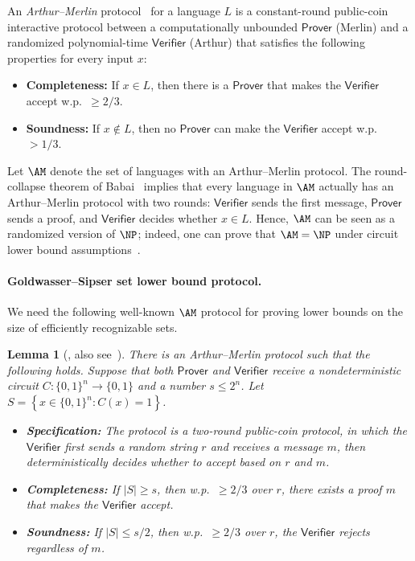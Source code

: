 \documentclass[10pt,a4paper]{article}
\newtheorem{lemma}[theorem]{Lemma}
\theoremstyle{definition}
\theoremstyle{remark}
\newcommand{\Prover}{\mathsf{Prover}}
\newcommand{\Verifier}{\mathsf{Verifier}}
\newcommand{\cbra}[1]{\left\{ #1 \right\}}
\begin{document}
An \emph{Arthur--Merlin} protocol~\cite{Babai85} for a language $L$ is a constant-round public-coin interactive protocol between a computationally unbounded $\Prover$ (Merlin) and a randomized polynomial-time $\Verifier$ (Arthur) that satisfies the following properties for every input $x$:
\begin{itemize}
    \item {\bf Completeness:} If $x\in L$, then there is a $\Prover$ that makes the $\Verifier$ accept w.p.~$\ge 2/3$.
    \item {\bf Soundness:} If $x\not\in L$, then no $\Prover$ can make the $\Verifier$ accept w.p.~$>1/3$.
\end{itemize}

Let $\AM$ denote the set of languages with an Arthur--Merlin protocol. The round-collapse theorem of Babai~\cite{Babai85} implies that every language in $\AM$ actually has an Arthur--Merlin protocol with two rounds: $\Verifier$ sends the first message, $\Prover$ sends a proof, and $\Verifier$ decides whether $x\in L$. Hence, $\AM$ can be seen as a randomized version of $\NP$; indeed, one can prove that $\AM = \NP$ under circuit lower bound assumptions~\cite{KlivansM02, MiltersenV05, ShaltielU05, ShaltielU06}.



\paragraph{Goldwasser--Sipser set lower bound protocol.} We need the following well-known $\AM$ protocol for proving lower bounds on the size of efficiently recognizable sets.
\begin{lemma}[\cite{GS86}, also see~{\cite[section 8.4]{AB09}}]\label{lemma:GS-protocol}
There is an Arthur--Merlin protocol such that the following holds. Suppose that both $\Prover$ and $\Verifier$ receive a nondeterministic circuit $C:\{0,1\}^n \to \{0,1\}$ and a number $s\le 2^n$. Let $S=\cbra{x\in \{0,1\}^n : C(x)=1}$.
\begin{itemize}
    \item \textbf{Specification:} The protocol is a two-round public-coin protocol, in which the $\Verifier$ first sends a random string $r$ and receives a message $m$, then deterministically decides whether to accept based on $r$ and $m$.
    \item \textbf{Completeness: }If $|S|\ge s$, then w.p.~$\ge 2/3$ over $r$, there exists a proof $m$ that makes the $\Verifier$ accept.
    \item \textbf{Soundness: }If $|S|\le s/2$, then w.p.~$\ge 2/3$ over $r$, the $\Verifier$ rejects regardless of $m$.
\end{itemize}
\end{lemma}
\end{document}
